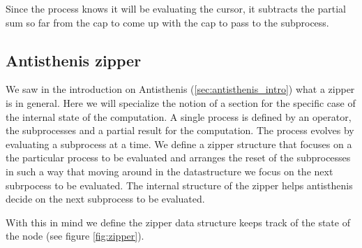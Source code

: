 Since the process knows it will be evaluating the cursor, it subtracts
the partial sum so far from the cap to come up with the cap to pass to
the subprocess.


\subsection{Antisthenis zipper}
\label{sec:zipper}
We saw in the introduction on Antisthenis
(\ref{sec:antisthenis_intro}) what a zipper is in general. Here we
will specialize the notion of a section for the specific case of the
internal state of the computation. A single process is defined by an
operator, the subprocesses and a partial result for the
computation. The process evolves by evaluating a subprocess at a
time. We define a zipper structure that focuses on a the particular
process to be evaluated and arranges the reset of the subprocesses in
such a way that moving around in the datastructure we focus on the
next subrpocess to be evaluated. The internal structure of the zipper
helps antisthenis decide on the next subprocess to be evaluated.

With this in mind we define the zipper data structure keeps track of
the state of the node (see figure \ref{fig:zipper}).

